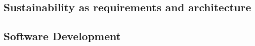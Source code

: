 

\subsection{Sustainability as requirements and architecture}




\subsection{Software Development}

